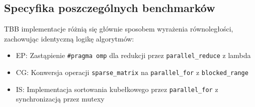 \subsection{Specyfika poszczególnych benchmarków}
TBB implementacje różnią się głównie sposobem wyrażenia równoległości, zachowując identyczną logikę algorytmów:
\begin{itemize}
    \item EP: Zastąpienie \texttt{\#pragma omp} dla redukcji przez \texttt{parallel\_reduce} z lambda
    \item CG: Konwersja operacji \texttt{sparse\_matrix} na \texttt{parallel\_for} z \texttt{blocked\_range}
    \item IS: Implementacja sortowania kubełkowego przez \texttt{parallel\_for} z synchronizacją przez mutexy
\end{itemize}

